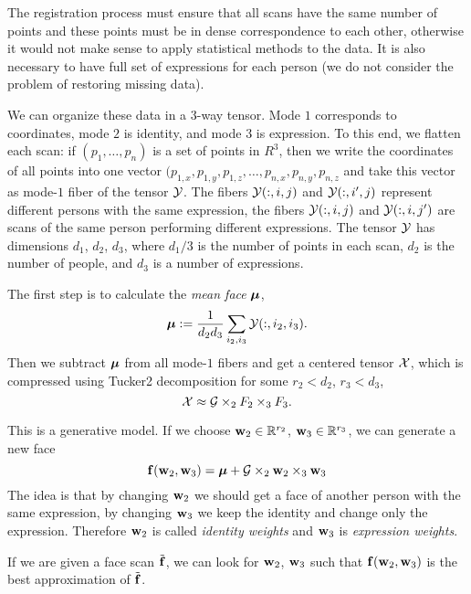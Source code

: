 The registration process must ensure that all scans have the same number of points
and these points must be in dense correspondence to each other, otherwise
it would not make sense to apply statistical methods
to the data. It is also necessary to have full set of expressions for each 
person (we do not consider the problem of restoring missing data).

We can organize these data in a $3$-way tensor. Mode $1$ corresponds
to coordinates, mode $2$ is identity, and mode $3$ is expression.
To this end, we flatten each scan: if $(p_1, \dots, p_n)$ is a set of points in $R^3$, then we write
the coordinates of all points into one vector $(p_{1, x}, p_{1, y}, p_{1, z}, \dots, p_{n, x}, p_{n, y}, p_{n, z}$
and take this vector as mode-$1$ fiber of the tensor $\mathcal{Y}$. The fibers $\mathcal{Y}(:, i, j)$
and $\mathcal{Y}(:, i', j)$ represent different persons with the same expression, the fibers
$\mathcal{Y}(:, i, j)$ and $\mathcal{Y}(:, i, j')$ are scans of the same person performing different expressions. 
The tensor $\mathcal{Y}$ has dimensions $d_1$, $d_2$, $d_3$, where $d_1 / 3$ is the number
of points in each scan, $d_2$ is the number of people, and $d_3$ is a number
of expressions.



The first step is to calculate the \textit{mean face} ${\boldsymbol{\mu}}$,
\begin{equation}
    {\boldsymbol{\mu}} := \frac{1}{d_2 d_3} \sum_{i_2, i_3} \mathcal{Y}(:, i_2, i_3).
\end{equation}
Then we subtract ${\boldsymbol{\mu}}$ from all mode-$1$ fibers and get a centered tensor $\mathcal{X}$, 
which is compressed using Tucker2 decomposition for some $r_2 < d_2$, $r_3 < d_3$,
\begin{equation}
    \mathcal{X} \approx \mathcal{G} \times_2 F_2 \times_3 F_3.
\end{equation}



This is a generative model. If we choose $\mathbf{w}_2 \in \mathbb{R}^{r_2}$,
${\mathbf{w}}_3 \in \mathbb{R}^{r_3}$, we can generate a new face
\begin{equation}
    \label{mlm_generate}
    {\mathbf{f}}({\mathbf{w}}_2, {\mathbf{w}}_3) = {\boldsymbol{\mu}} +  \mathcal{G} \times_2 {\mathbf{w}}_2 \times_3 {\mathbf{w}}_3
\end{equation}
The idea is that by changing ${\mathbf{w}}_2$ we should get a face of another person
with the same expression, by changing ${\mathbf{w}}_3$ we keep the identity
and change only the expression. Therefore ${\mathbf{w}}_2$ is called \textit{identity weights}
and ${\mathbf{w}}_3$ is \textit{expression weights}.

If we are given a face scan $\tilde{{\mathbf{f}}}$, we can look for ${\mathbf{w}}_2$, ${\mathbf{w}}_3$ such that
${\mathbf{f}}({\mathbf{w}}_2, {\mathbf{w}}_3)$ is the best approximation  of $\tilde{{\mathbf{f}}}$. 



